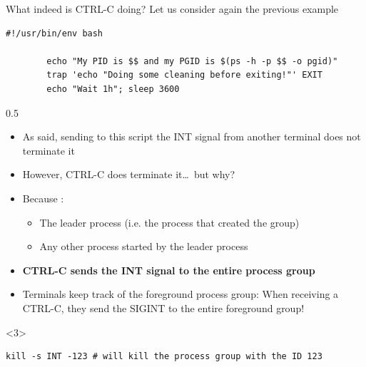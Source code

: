 \begin{frame}[fragile]{What indeed is CTRL-C doing?}
    \vspace{-2mm}
    Let us consider again the previous example
    \begin{lstlisting}[style=MyBash, numbers=none, aboveskip=2mm, belowskip=-4mm]
        #!/usr/bin/env bash

        echo "My PID is $$ and my PGID is $(ps -h -p $$ -o pgid)"
        trap 'echo "Doing some cleaning before exiting!"' EXIT
        echo "Wait 1h"; sleep 3600
    \end{lstlisting}
    \begin{overlayarea}{\textwidth}{0.5\textheight}
        \begin{itemize}
            \item<1-> As said, sending to this script the INT signal from another terminal does not terminate it
            \item<1-> However, CTRL-C does terminate it\ldots\ but why?
            \item<2-> Because :
                      \begin{itemize}
                          \item The leader process (i.e. the process that created the group)
                          \item Any other process started by the leader process
                      \end{itemize}
            \item<2-> \alert{\textbf{CTRL-C sends the INT signal to the entire process group}}
            \item<2-> Terminals keep track of the foreground process group: When receiving a CTRL-C, they send the SIGINT to the entire foreground group!
        \end{itemize}
        \begin{onlyenv}<3>
            \begin{lstlisting}[style=MyBash, numbers=none, xleftmargin=2mm, xrightmargin=2mm]
                kill -s INT -123 # will kill the process group with the ID 123
            \end{lstlisting}
        \end{onlyenv}
    \end{overlayarea}
\end{frame}
